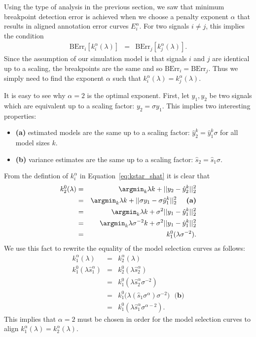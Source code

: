 \documentclass{article}
\begin{document}

\newpage
Using the type of analysis in the previous section, we saw that
minimum breakpoint detection error is achieved when we choose a
penalty exponent $\alpha$ that results in aligned annotation error
curves $E_i^\alpha$. For two signals $i\neq j$, this implies the
condition
\begin{eqnarray}
  \label{eq:equal_err}
  \text{BErr}_i[k^\alpha_i(\lambda)]&=&  
  \text{BErr}_j[k^\alpha_j(\lambda)].
\end{eqnarray}
Since the assumption of our simulation model is that signals $i$ and
$j$ are identical up to a scaling, the breakpoints are the same and so
$\text{BErr}_i=\text{BErr}_j$. Thus we simply need to find the 
exponent $\alpha$ such that $k^\alpha_i(\lambda)=k^\alpha_j(\lambda)$.

It is easy to see why $\alpha=2$ is the optimal exponent. First, let
$y_1,y_2$ be two signals which are equivalent up to a scaling factor:
$y_2=\sigma y_1$. This implies two interesting properties:
\begin{itemize}
\item \textbf{(a)} estimated models are the same up to a scaling
  factor: $\hat y_2^k = \hat y_1^k\sigma$ for all model sizes $k$.
\item \textbf{(b)} variance estimates are the same up to a scaling factor:
  $\hat s_2 = \hat s_1 \sigma$.
\end{itemize}
From the defintion of $k^\alpha_i$ in Equation~\ref{eq:kstar_shat} it
is clear that
\begin{eqnarray*}
  \label{eq:k2=k1}
  k^0_2(\lambda) 
&=& \argmin_k \lambda k + ||y_2 - \hat y_2^k||_2^2\\
&=&\argmin_k \lambda k + ||\sigma y_1 - \sigma \hat y_1^k||_2^2 
\ \ \ \textbf{ (a)}\\
&=&\argmin_k \lambda k + \sigma^2||y_1 - \hat y_1^k||_2^2\\
&=&\argmin_k \lambda\sigma^{-2} k+\sigma^2||y_1 - \hat y_1^k||_2^2\\
&=& k^0_1(\lambda \sigma^{-2}).
\end{eqnarray*}
We use this fact to rewrite the equality of the model selection curves
as follows:
\begin{eqnarray*}
  k_1^\alpha(\lambda) &=& k_2^\alpha(\lambda) \\
k_1^0(\lambda \hat s_1^\alpha) &=& k_2^0(\lambda \hat s_2^\alpha)\\
&=& k^0_1(\lambda\hat s_2^\alpha\sigma^{-2})\\
&=&k_1^0\big(\lambda(\hat s_1\sigma^\alpha)\sigma^{-2}\big)\ \ \ \textbf{(b)}\\
&=&k_1^0(\lambda\hat s_1^\alpha \sigma^{\alpha-2}).
\end{eqnarray*}
This implies that $\alpha=2$ must be chosen in order for the model
selection curves to align $k_1^\alpha(\lambda)=k_2^\alpha(\lambda)$.
\end{document}
